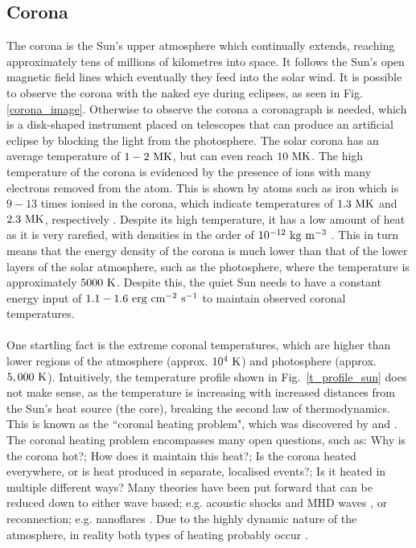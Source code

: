 \documentclass[12pt]{ociamthesis}
\newcommand{\np}{\\ \\}
\begin{document}
\subsection{Corona}
\label{ssec:corona}
The corona is the Sun's upper atmosphere which continually extends, reaching approximately tens of millions of kilometres into space. It follows the Sun's open magnetic field lines which eventually they feed into the solar wind. It is possible to observe the corona with the naked eye during eclipses, as seen in Fig. \ref{corona_image}. Otherwise to observe the corona a coronagraph is needed, which is a disk-shaped instrument placed on telescopes that can produce an artificial eclipse by blocking the light from the photosphere. The solar corona has an average temperature of $1-2~\rm{MK}$, but can even reach $10~\rm{MK}$. The high temperature of the corona is evidenced by the presence of ions with many electrons removed from the atom. This is shown by atoms such as iron which is $9-13$ times ionised in the corona, which indicate temperatures of $1.3~\rm{MK}$ and $2.3~\rm{MK}$, respectively \citep{narayanan2014introduction}. Despite its high temperature, it has a low amount of heat as it is very rarefied, with densities in the order of $10^{-12}~\rm{kg~m^{-3}}$ \citep{priest2014magnetohydrodynamics}. This in turn means that the energy density of the corona is much lower than that of the lower layers of the solar atmosphere, such as the photosphere, where the temperature is approximately $5000~\rm{K}$. Despite this, the quiet Sun needs to have a constant energy input of $1.1-1.6~\rm{erg~cm^{-2}~s^{-1}}$ \citep{Sakurai2017PJAB9387S} to maintain observed coronal temperatures. \np
%
One startling fact is the extreme coronal temperatures, which are higher than lower regions of the atmosphere (approx. $10^4~\rm{K}$) and photosphere (approx. $5,000~\rm{K}$). Intuitively, the temperature profile shown in Fig.~\ref{t_profile_sun} does not make sense, as the temperature is increasing with increased distances from the Sun's heat source (the core), breaking the second law of thermodynamics. This is known as the ``coronal heating problem", which was discovered by \cite{Grotrian1939} and \cite{Edl1943}. The coronal heating problem encompasses many open questions, such as: Why is the corona hot?; How does it maintain this heat?; Is the corona heated everywhere, or is heat produced in separate, localised events?; Is it heated in multiple different ways? Many theories have been put forward that can be reduced down to either wave based; e.g. acoustic shocks and MHD waves \citep{Alfv1947MNRAS107211A, Uchida1974SoPh35451U, Wentzel1974SoPh39129W, Priest1998Natur393545P, Antolin2008IAUS247279A, Escande2019NatSR914274E}, or reconnection; e.g. nanoflares \citep{Parker1988ApJ330474P, Cargill1993SoPh147263C, Parnell2000ApJ529554P, Klimchuk2001ApJ553440K,  Cargill2004ApJ605911C, Antolin2021NatAs554A}. Due to the highly dynamic nature of the atmosphere, in reality both types of heating probably occur \citep{Parnell2012RSPTA3703217P}. \np
\end{document}
